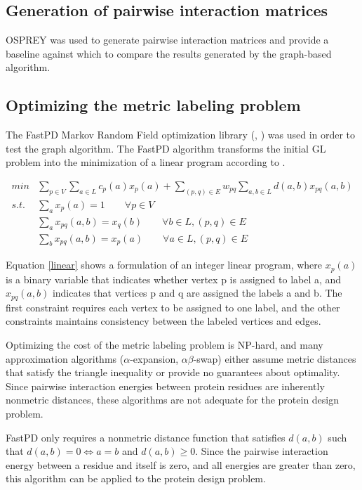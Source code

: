 \documentclass[11pt]{article}
\begin{document}
	\subsection{Generation of pairwise interaction matrices}
	OSPREY was used to generate pairwise interaction matrices and provide a baseline
	against which to compare the results generated by the graph-based algorithm.
	
	\subsection{Optimizing the metric labeling problem}
	The FastPD Markov Random Field optimization library 
	(\cite{Karmarkar}, \cite{Komodakis}) was used in order to test the graph
	algorithm. The FastPD algorithm transforms the initial GL problem into the
	minimization of a linear program according to \cite{CKNZ}. 
	
	\begin{equation}
		\begin{split}
		min & \sum_{p \in V} \sum_{a\in L} c_p(a)x_p(a)+ \sum_{(p,q) \in E} w_{pq}
		 \sum_{a,b \in L}d(a,b) x_{pq}(a,b)\\
		s.t. & \sum_a x_p(a) =1 \qquad \forall p \in V\\
		& \sum_a x_{pq}(a,b)=x_q(b) \qquad \forall b \in L, (p,q) \in E\\
		& \sum_b x_{pq}(a,b)=x_p(a) \qquad \forall a \in L, (p,q) \in E
		\end{split}
	\label{linear}
	\end{equation}
	
	Equation \ref{linear} shows a formulation of an integer linear program, where
	$x_p(a)$ is a binary variable that indicates whether vertex p is assigned to
	label a, and $x_{pq}(a,b)$ indicates that vertices p and q are assigned the
	labels a and b.  The first constraint requires each vertex to be assigned to
	one label, and the other constraints maintains consistency between the labeled
	vertices and edges.
	
	Optimizing the cost of the metric labeling problem is NP-hard, and many
	approximation algorithms ($\alpha$-expansion, $\alpha\beta$-swap) either
	assume metric distances that satisfy the triangle inequality or provide no
	guarantees about optimality.  Since pairwise interaction energies between
	protein residues are inherently nonmetric distances, these algorithms are not
	adequate for the protein design problem.  
	
	FastPD only requires a nonmetric distance function that satisfies $d(a,b)$ such
	that $d(a,b)=0 \iff a=b$ and $d(a,b) \geq 0$.  Since the pairwise interaction
	energy between a residue and itself is zero, and all energies are greater than
	zero, this algorithm can be applied to the protein design problem.  
	
\end{document}
